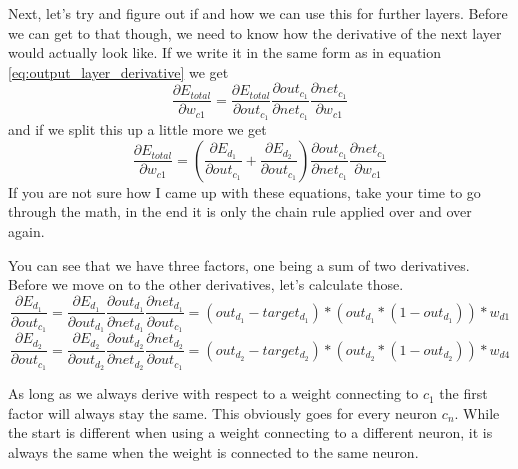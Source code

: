 \documentclass[11pt, halfparskip]{article}
\begin{document}
    \newpage
    \noindent
    Next, let's try and figure out if and how we can use this for further layers. Before we can get to that though, we need to know how the derivative of the next layer would actually
    look like. If we write it in the same form as in equation \ref{eq:output_layer_derivative} we get
    \begin{equation}
    \label{eq:hidden_layer_two_derivative}
    	\frac{\partial E_{total}}{\partial w_{c1}} = \frac{\partial E_{total}}{\partial out_{c_1}} \frac{\partial out_{c_1}}{\partial net_{c_1}} \frac{\partial net_{c_1}}{\partial w_{c1}}
    \end{equation}
    and if we split this up a little more we get
    \begin{equation}
    \label{eq:hidden_layer_two_split_derivative}
    	\frac{\partial E_{total}}{\partial w_{c1}} = (\frac{\partial E_{d_1}}{\partial out_{c_1}} + \frac{\partial E_{d_2}}{\partial out_{c_1}})
    	\frac{\partial out_{c_1}}{\partial net_{c_1}} \frac{\partial net_{c_1}}{\partial w_{c1}}
    \end{equation}
    If you are not sure how I came up with these equations, take your time to go through the math, in the end it is only the chain rule applied over and over again.
    
    \noindent \newline
    You can see that we have three factors, one being a sum of two derivatives. Before we move on to the other derivatives, let's calculate those.
    \begin{equation}
    \label{eq:error_d1_with_respect_to_c1}
    	\frac{\partial E_{d_1}}{\partial out_{c_1}} = \frac{\partial E_{d_1}}{\partial out_{d_1}} \frac{\partial out_{d_1}}{\partial net_{d_1}} 
    	\frac{\partial net_{d_1}}{\partial out_{c_1}} = (out_{d_1} - target_{d_1}) * (out_{d_1} * (1 - out_{d_1})) * w_{d1}
    \end{equation}
    \begin{equation}
    \label{eq:error_d2_with_respect_to_c2}
    	\frac{\partial E_{d_2}}{\partial out_{c_1}} = \frac{\partial E_{d_2}}{\partial out_{d_2}} \frac{\partial out_{d_2}}{\partial net_{d_2}} 
    	\frac{\partial net_{d_2}}{\partial out_{c_1}} = (out_{d_2} - target_{d_2}) * (out_{d_2} * (1 - out_{d_2})) * w_{d4}
    \end{equation}
    
    \noindent \newline
    As long as we always derive with respect to a weight connecting to $c_1$ the first factor will always stay the same. This obviously goes for every neuron $c_n$. While the start is
    different when using a weight connecting to a different neuron, it is always the same when the weight is connected to the same neuron.
    
\end{document}
